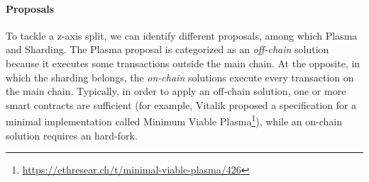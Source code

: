 \paragraph{Proposals} To tackle a z-axis split, we can identify different
proposals, among which Plasma and Sharding. The Plasma proposal is
categorized as an \emph{off-chain} solution because it executes some
transactions outside the main chain. At the opposite, in which the sharding
belongs, the \emph{on-chain} solutions execute every transaction on the main
chain. Typically, in order to apply an off-chain solution, one or more smart
contracts are sufficient (for example, Vitalik proposed a specification for a
minimal implementation called Minimum Viable
Plasma\footnote{\url{https://ethresear.ch/t/minimal-viable-plasma/426}}), while
an on-chain solution requires an hard-fork.


